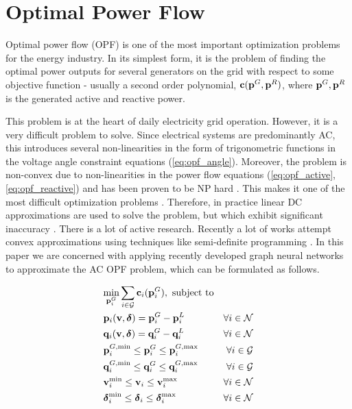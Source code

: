 \documentclass[conference,9pt]{IEEEtran}
\begin{document}
	\section{Optimal Power Flow}
	
	Optimal power flow (OPF) is one of the most important optimization problems for the energy industry. In its simplest form, it is the problem of finding the optimal power outputs for several generators on the grid with respect to some objective function - usually a second order polynomial, ${\mathbf c}({\mathbf p}^G, {\mathbf p}^R)$, where ${\mathbf p}^G, {\mathbf p}^R$ is the generated active and reactive power.
	
	This problem is at the heart of daily electricity grid operation. However, it is a very difficult problem to solve. Since electrical systems are predominantly AC, this introduces several non-linearities in the form of trigonometric functions in the voltage angle constraint equations (\ref{eq:opf_angle}). Moreover, the problem is non-convex due to non-linearities in the power flow equations (\ref{eq:opf_active}, \ref{eq:opf_reactive}) \cite{nonconvex, molzahn} and has been proven to be NP hard \cite{bienstock}. This makes it one of the most difficult optimization problems \cite{acopf}. Therefore, in practice linear DC approximations are used to solve the problem, but which exhibit significant inaccuracy \cite{molzahn}. There is a lot of active research. Recently a lot of works attempt convex approximations using techniques like semi-definite programming \cite{molzahn}. In this paper we are concerned with applying recently developed \red{[x]} graph neural networks to approximate the AC OPF problem, which can be formulated as follows.
	
	\begin{align}
		&\underset{\bbp_i^G}{\min} \sum_{i \in \ccalG} \bbc_i(\bbp_i^G), \text{ subject to}\\
		&\bbp_i(\bbv,\bbdelta) = \bbp_i^G-\bbp_i^L &\forall  i \in \ccalN \label{eq:opf_active} \\
		&\bbq_i(\bbv,\bbdelta) = \bbq^G_i - \bbq^L_i &\forall  i \in \ccalN \label{eq:opf_reactive}\\
		&\bbp_i^{G,\text{min}} \le \bbp_i^G \le \bbp_i^{G,\text{max}} &\forall  i \in \ccalG \label{eq:opf_gen_active}\\
		&\bbq_i^{G,\text{min}} \le \bbq_i^G \le \bbq_i^{G,\text{max}} &\forall  i \in \ccalG \label{eq:opf_gen_reactive}\\
		&\bbv_i^{\text{min}} \le \bbv_i \le \bbv_i^{\text{max}} &\forall i \in \ccalN \label{eq:opf_line_constraints}\\
		&\bbdelta_i^{\text{min}} \le \bbdelta_i \le \bbdelta_i^{\text{max}} &\forall  i \in \ccalN \label{eq:opf_angle}\\
	\end{align}
	
\end{document}
